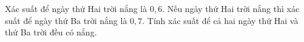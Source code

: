 \begin{ex}
Xác suất để ngày thứ Hai trời nắng là $0{,}6$. Nếu ngày thứ Hai trời nắng thì xác suất để ngày thứ Ba trời nắng là $0{,}7$. Tính xác suất để cả hai ngày thứ Hai và thứ Ba trời đều có nắng.
\end{ex}
